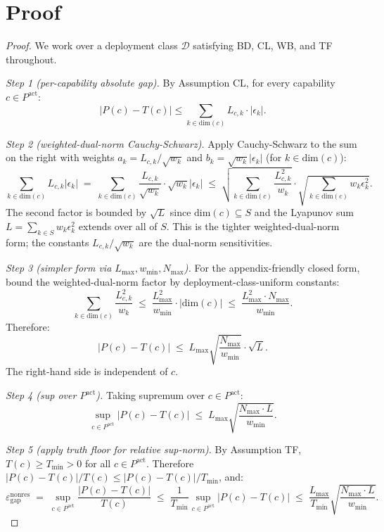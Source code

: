\documentclass{article}
\newcommand{\Lyap}{L}
\newcommand{\epsnonres}{\varepsilon_{\mathrm{gap}}^{\mathrm{nonres}}}
\begin{document}
\section{Proof}

\begin{proof}
We work over a deployment class $\mathcal{D}$ satisfying BD, CL,
WB, and TF throughout.

\emph{Step 1 (per-capability absolute gap).}  By Assumption CL,
for every capability $c \in P^{\mathrm{act}}$:
\[
  |P(c) - T(c)| \leq \sum_{k \in \mathrm{dim}(c)} L_{c,k} \cdot
  |\epsilon_k|.
\]

\emph{Step 2 (weighted-dual-norm Cauchy-Schwarz).}  Apply
Cauchy-Schwarz to the sum on the right with weights $a_k =
L_{c,k}/\sqrt{w_k}$ and $b_k = \sqrt{w_k} |\epsilon_k|$ (for $k \in
\mathrm{dim}(c)$):
\[
  \sum_{k \in \mathrm{dim}(c)} L_{c,k} |\epsilon_k|
  \;=\; \sum_{k \in \mathrm{dim}(c)}
  \frac{L_{c,k}}{\sqrt{w_k}} \cdot \sqrt{w_k} |\epsilon_k|
  \;\leq\;
  \sqrt{\sum_{k \in \mathrm{dim}(c)} \frac{L_{c,k}^2}{w_k}}
  \cdot \sqrt{\sum_{k \in \mathrm{dim}(c)} w_k \epsilon_k^2}.
\]
The second factor is bounded by $\sqrt{\Lyap}$ since
$\mathrm{dim}(c) \subseteq S$ and the Lyapunov sum
$\Lyap = \sum_{k \in S} w_k \epsilon_k^2$ extends over all of $S$.
This is the tighter weighted-dual-norm form; the constants
$L_{c,k}/\sqrt{w_k}$ are the dual-norm sensitivities.

\emph{Step 3 (simpler form via $L_{\max}, w_{\min}, N_{\max}$).}
For the appendix-friendly closed form, bound the weighted-dual-norm
factor by deployment-class-uniform constants:
\[
  \sum_{k \in \mathrm{dim}(c)} \frac{L_{c,k}^2}{w_k}
  \;\leq\; \frac{L_{\max}^2}{w_{\min}} \cdot |\mathrm{dim}(c)|
  \;\leq\; \frac{L_{\max}^2 \cdot N_{\max}}{w_{\min}}.
\]
Therefore:
\[
  |P(c) - T(c)|
  \;\leq\; L_{\max} \sqrt{\frac{N_{\max}}{w_{\min}}} \cdot \sqrt{\Lyap}.
\]
The right-hand side is independent of $c$.

\emph{Step 4 (sup over $P^{\mathrm{act}}$).}  Taking supremum over
$c \in P^{\mathrm{act}}$:
\[
  \sup_{c \in P^{\mathrm{act}}} |P(c) - T(c)|
  \;\leq\; L_{\max} \sqrt{\frac{N_{\max} \cdot \Lyap}{w_{\min}}}.
\]

\emph{Step 5 (apply truth floor for relative sup-norm).}  By
Assumption TF, $T(c) \geq T_{\min} > 0$ for all $c \in
P^{\mathrm{act}}$.  Therefore $|P(c) - T(c)| / T(c) \leq |P(c) -
T(c)| / T_{\min}$, and:
\[
  \epsnonres \;=\; \sup_{c \in P^{\mathrm{act}}}
  \frac{|P(c) - T(c)|}{T(c)}
  \;\leq\; \frac{1}{T_{\min}} \sup_{c \in P^{\mathrm{act}}}
  |P(c) - T(c)|
  \;\leq\; \frac{L_{\max}}{T_{\min}} \sqrt{\frac{N_{\max} \cdot \Lyap}
  {w_{\min}}}.
\]


\end{proof}
\end{document}
